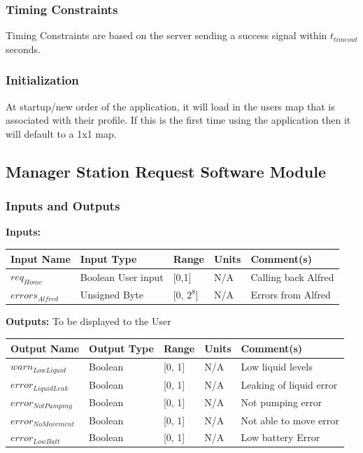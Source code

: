 \documentclass [10pt]{article}
\begin{document}
\subsubsection{Timing Constraints}
Timing Constraints are based on the server sending a success signal within  $ t_{timeout} $ seconds.

\subsubsection{Initialization}
At startup/new order of the application, it will load in the users map that is associated with their profile. If this is the first time using the application then it will default to a 1x1 map.

\subsection{Manager Station Request Software Module}

\subsubsection{Inputs and Outputs}

\textbf{Inputs: } 

\begin{longtable}{|l|l|l|l|l|}\hline 
	\rowcolor{tableCell}Input Name & Input Type & Range & Units & Comment(s) \\ \hline
	$ req_{Home} $ & Boolean User input &  [0,1] & N/A & Calling back Alfred \\ \hline
	$  errors_{Alfred} $ & Unsigned Byte & [0, $2^{8}$]& N/A & Errors from Alfred \\ \hline
\end{longtable}


\textbf{Outputs: } To be displayed to the User
\begin{longtable}{|l|l|l|l|l|}\hline 
	\rowcolor{tableCell}Output Name & Output Type & Range & Units & Comment(s) \\ \hline
	$  warn_{LowLiquid} $ & Boolean & [0, 1]& N/A & Low liquid levels \\ \hline
	$  error_{LiquidLeak} $ & Boolean & [0, 1]& N/A & Leaking of liquid error \\ \hline
	$  error_{NotPumping} $ & Boolean & [0, 1]& N/A & Not pumping error \\ \hline
	$  error_{NoMovement} $ & Boolean & [0, 1]& N/A & Not able to move error \\ \hline
	$  error_{LowBatt} $ & Boolean & [0, 1]& N/A & Low battery Error \\ \hline
\end{longtable}
\end{document}
